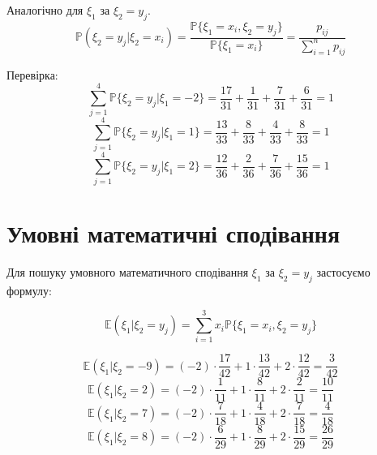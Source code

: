 \documentclass[14pt, a4paper, ukrainian]{extreport}
\begin{document}
	Аналогічно для $\xi_1$ за $\xi_2 = y_j$.
	$$\mathbb{P}(\xi_2=y_j|\xi_2=x_i) = \frac{\mathbb{P}\{ \xi_1 = x_i, \xi_2 = y_j\}}{\mathbb{P}\{\xi_1=x_i\}} = \frac{p_{ij}}{\sum_{i=1}^{n}p_{ij}}$$
	
	\begin{table}[H]
		\caption{\label{tab:py|px}Умовні ряди розподілу для $\xi_2$ за $\xi_1 = x_i$}
		\begin{center}
		\end{center}
	\end{table}
	
	
	Перевірка:
	$$ \sum_{j=1}^{4}\mathbb{P}\{\xi_2 = y_j | \xi_1=-2\} = \frac{17}{31} + \frac{1}{31} + \frac{7}{31} + \frac{6}{31}= 1$$
	$$ \sum_{j=1}^{4}\mathbb{P}\{\xi_2 = y_j | \xi_1=1\} = \frac{13}{33} + \frac{8}{33} + \frac{4}{33} + \frac{8}{33} = 1$$
	$$ \sum_{j=1}^{4}\mathbb{P}\{\xi_2 = y_j | \xi_1=2\} = \frac{12}{36} + \frac{2}{36} + \frac{7}{36} + \frac{15}{36} = 1$$
	
	\section{Умовні математичні сподівання}
	
	Для пошуку умовного математичного сподівання $\xi_1$ за $\xi_2=y_j$ застосуємо формулу:
	
	$$\mathbb{E}(\xi_1|\xi_2 = y_j) = \sum_{i=1}^{3}x_i\mathbb{P}\{\xi_1=x_i, \xi_2 = y_j\}$$
	
	$$\mathbb{E}(\xi_1|\xi_2 = -9) = (-2)\cdot \frac{17}{42} + 1 \cdot \frac{13}{42} + 2 \cdot \frac{12}{42} = \frac{3}{42}$$
	$$\mathbb{E}(\xi_1|\xi_2 = 2) = (-2)\cdot \frac{1}{11} + 1 \cdot \frac{8}{11} + 2 \cdot \frac{2}{11} = \frac{10}{11}$$
	$$\mathbb{E}(\xi_1|\xi_2 = 7) = (-2)\cdot \frac{7}{18} + 1 \cdot \frac{4}{18} + 2 \cdot \frac{7}{18} = \frac{4}{18}$$
	$$\mathbb{E}(\xi_1|\xi_2 = 8) = (-2)\cdot \frac{6}{29} + 1 \cdot \frac{8}{29} + 2 \cdot \frac{15}{29} = \frac{26}{29}$$
	
\end{document}
